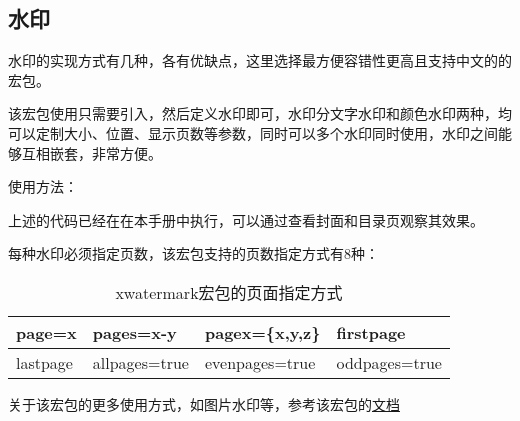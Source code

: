     \subsection{水印}

    水印的实现方式有几种，各有优缺点，这里选择最方便容错性更高且支持中文的的宏包。

    该宏包使用只需要引入，然后定义水印即可，水印分文字水印和颜色水印两种，均可以定制大小、位置、显示页数等参数，同时可以多个水印同时使用，水印之间能够互相嵌套，非常方便。

    使用方法：
    \begin{texcode}
        \usepackage[printwatermark,disablegeometry]{xwatermark}

    \end{texcode}
    上述的代码已经在在本手册中执行，可以通过查看封面和目录页观察其效果。

    每种水印必须指定页数，该宏包支持的页数指定方式有8种：
    \begin{center}
        \setlength\tablewidth{\dimexpr (\textwidth -8\tabcolsep)}
        \begin{table}[H]
            \begin{tabular}{|p{0.21\tablewidth}<{\centering}|p{0.26\tablewidth}<{\centering}|p{0.26\tablewidth}<{\centering}|p{0.26\tablewidth}<{\centering}|}
                \hline
                page=x&pages=x-y&pagex=\{x,y,z\}&firstpage\\
                \hline
                lastpage&allpages=true&evenpages=true&oddpages=true\\
                \hline
            \end{tabular}
            \caption{xwatermark宏包的页面指定方式}
        \end{table}
    \end{center}
    关于该宏包的更多使用方式，如图片水印等，参考该宏包的\href{http://ftp.jaist.ac.jp/pub/CTAN/macros/latex/contrib/xwatermark/doc/xwatermark-guide.pdf}{文档}
    
